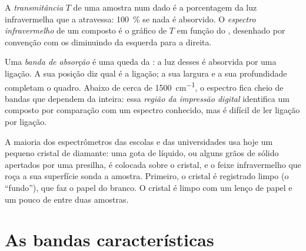 \begin{definition}\label{def:g11:infrared:spectrum}
A \emph{transmitância} $T$ de uma amostra num dado
 é a porcentagem da luz infravermelha que a atravessa:
\qty{100}{\percent} se nada é absorvido. O \emph{espectro
infravermelho} de um composto é o gráfico
de $T$ em função do , desenhado por convenção com os
 diminuindo da esquerda para a direita.
\end{definition}

\begin{definition}\label{def:g11:infrared:band}
Uma \emph{banda de absorção} é uma queda da
: a luz desses  é absorvida por uma ligação.
A sua posição diz qual é a ligação; a sua largura e a sua profundidade
completam o quadro. Abaixo de cerca de \qty{1500}{cm^{-1}}, o espectro
fica cheio de bandas que dependem da  inteira: essa \emph{região
da impressão digital} identifica um
composto por comparação com um espectro conhecido, mas é difícil de ler
ligação por ligação.
\end{definition}

\begin{inthelab}
A maioria dos espectrômetros das escolas e das universidades usa hoje
um pequeno cristal de diamante: uma gota de líquido, ou alguns grãos de
sólido apertados por uma presilha, é colocada sobre o cristal, e o feixe
infravermelho que roça a sua superfície sonda a amostra. Primeiro, o
cristal é registrado limpo (o ``fundo''), que faz o papel do branco. O
cristal é limpo com um lenço de papel e um pouco de  entre duas
amostras.
\end{inthelab}

\section{As bandas características}

